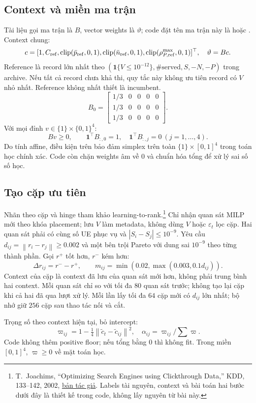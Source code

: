\documentclass[11pt,a4paper]{article}
\newcommand{\ind}{\mathbf1}
\newcommand{\norm}[1]{\left\lVert#1\right\rVert}
\newcommand{\clip}{\operatorname{clip}}
\newcommand{\code}[1]{\texttt{\detokenize{#1}}}
\begin{document}
\subsection{Context và miền ma trận}
Tài liệu gọi ma trận là $B$, vector weights là $\vartheta$; code đặt tên ma trận này là \code{vartheta} hoặc \code{matrix}.
Context chung:
\[
c=[1,C_{\rm ref},\clip(\bar p_{\rm ref},0,1),\clip(\bar n_{\rm ref},0,1),
\clip(\rho_{P,\rm ref}^{\max},0,1)]^\top,\quad\vartheta=Bc.
\]
Reference là record lớn nhất theo $(\ind\{V\le10^{-12}\},\#\mathrm{served},S,-N,-P)$ trong archive.
Nếu tất cả record chưa khả thi, quy tắc này không ưu tiên record có $V$ nhỏ nhất. Reference không nhất thiết là incumbent.
\[
B_0=\begin{bmatrix}1/3&0&0&0&0\\1/3&0&0&0&0\\1/3&0&0&0&0\end{bmatrix}.
\]
Với mọi đỉnh $v\in\{1\}\times\{0,1\}^4$:
\[
Bv\ge0,\qquad \mathbf1^\top B_{:,0}=1,\quad
\mathbf1^\top B_{:,j}=0\ (j=1,\ldots,4).
\]
Do tính affine, điều kiện trên bảo đảm simplex trên toàn $\{1\}\times[0,1]^4$ trong toán học chính xác.
Code còn chặn weights âm về $0$ và chuẩn hóa tổng để xử lý sai số số học.

\subsection{Tạo cặp ưu tiên}
Nhãn theo cặp và hinge tham khảo learning-to-rank.\footnote{T.~Joachims, ``Optimizing Search Engines using Clickthrough Data,'' KDD, 133--142, 2002, \href{https://www.cs.cornell.edu/~tj/publications/joachims_02c.pdf}{bản tác giả}. Labels tài nguyên, context và bài toán hai bước dưới đây là thiết kế trong code, không lấy nguyên từ bài này.}
Chỉ nhận quan sát MILP mới theo khóa placement; lưu $V$ làm metadata, không dùng $V$ hoặc $\varepsilon_t$ lọc cặp.
Hai quan sát phải có cùng số UE phục vụ và $|S_i-S_j|\le10^{-9}$.
Yêu cầu $d_{ij}=\norm{r_i-r_j}\ge0.002$ và một bên trội Pareto với dung sai $10^{-9}$ theo từng thành phần.
Gọi $r^+$ tốt hơn, $r^-$ kém hơn:
\[
\Delta r_{ij}=r^- -r^+,\qquad m_{ij}=\min(0.02,\max(0.003,0.1d_{ij})).
\]
Context của cặp là context đã lưu của quan sát mới hơn, không phải trung bình hai context.
Mỗi quan sát chỉ so với tối đa $80$ quan sát trước; không tạo lại cặp khi cả hai đã qua lượt xử lý.
Mỗi lần lấy tối đa $64$ cặp mới có $d_{ij}$ lớn nhất; bộ nhớ giữ $256$ cặp sau thao tác nối và cắt.

Trọng số theo context hiện tại, bỏ intercept:
\[
\varpi_{ij}=1-\tfrac14\norm{\widetilde c_t-\widetilde c_{ij}}^2,\quad
\alpha_{ij}=\varpi_{ij}/\sum\varpi.
\]
Code không thêm positive floor; nếu tổng bằng $0$ thì không fit. Trong miền $[0,1]^4$, $\varpi\ge0$ về mặt toán học.
\end{document}
